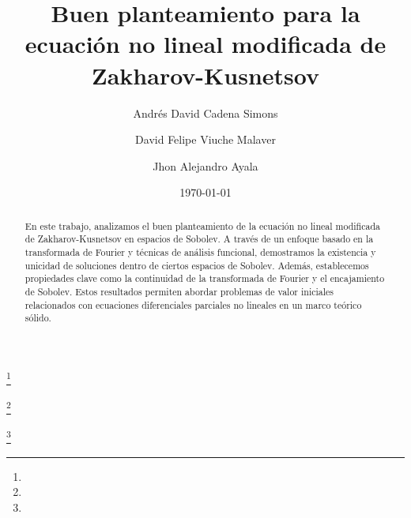 \documentclass{proc-l}
\theoremstyle{definition}
\theoremstyle{remark}
\numberwithin{equation}{section}
\begin{document}
\title{Buen planteamiento para la ecuación no lineal modificada de Zakharov-Kusnetsov}


\author{Andrés David Cadena Simons}
\address{}
\curraddr{}
\thanks{}

\author{David Felipe Viuche Malaver}
\address{}
\curraddr{}
\thanks{}

\author{Jhon Alejandro Ayala}
\address{}
\curraddr{}
\thanks{}



\date{\today}



\begin{abstract}
En este trabajo, analizamos el buen planteamiento de la ecuación no lineal modificada de Zakharov-Kusnetsov en espacios de Sobolev. A través de un enfoque basado en la transformada de Fourier y técnicas de análisis funcional, demostramos la existencia y unicidad de soluciones dentro de ciertos espacios de Sobolev. Además, establecemos propiedades clave como la continuidad de la transformada de Fourier y el encajamiento de Sobolev. Estos resultados permiten abordar problemas de valor iniciales relacionados con ecuaciones diferenciales parciales no lineales en un marco teórico sólido.
\end{abstract}

\maketitle








\end{document}
